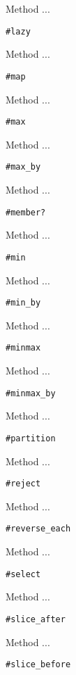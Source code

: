 Method ...
\begin{verbatim}
#lazy
\end{verbatim}

Method ...
\begin{verbatim}
#map
\end{verbatim}

Method ...
\begin{verbatim}
#max
\end{verbatim}

Method ...
\begin{verbatim}
#max_by
\end{verbatim}

Method ...
\begin{verbatim}
#member?
\end{verbatim}

Method ...
\begin{verbatim}
#min
\end{verbatim}

Method ...
\begin{verbatim}
#min_by
\end{verbatim}

Method ...
\begin{verbatim}
#minmax
\end{verbatim}

Method ...
\begin{verbatim}
#minmax_by
\end{verbatim}

Method ...
\begin{verbatim}
#partition
\end{verbatim}


Method ...
\begin{verbatim}
#reject
\end{verbatim}

Method ...
\begin{verbatim}
#reverse_each
\end{verbatim}

Method ...
\begin{verbatim}
#select
\end{verbatim}

Method ...
\begin{verbatim}
#slice_after
\end{verbatim}

Method ...
\begin{verbatim}
#slice_before
\end{verbatim}

